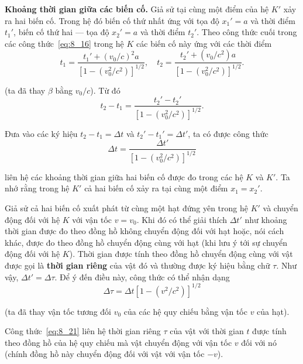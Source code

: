 \textbf{Khoảng thời gian giữa các biến cố.} Giả sử tại cùng một điểm của hệ $K'$ xảy ra hai biến cố. Trong hệ đó biến cố thứ nhất ứng với tọa độ $x_1'=a$ và thời điểm $t_1'$, biến cố thứ hai --- tọa độ $x_2'=a$ và thời điểm $t_2'$. Theo công thức cuối trong các công thức~\eqref{eq:8_16} trong hệ $K$ các biến cố này ứng với các thời điểm
\begin{equation*}
	t_1 = \frac{t_1' + (v_0/c)^2 a}{\left[1 - \left(v_0^2/c^2\right)\right]^{1/2}},\quad t_2 = \frac{t_2' + (v_0/c^2) a}{\left[1 - \left(v_0^2/c^2\right)\right]^{1/2}}.
\end{equation*}

\noindent
(ta đã thay $\beta$ bằng $v_0/c$). Từ đó
\begin{equation*}
	t_2 - t_1 = \frac{t_2' - t_2'}{\left[1 - \left(v_0^2/c^2\right)\right]^{1/2}}.
\end{equation*}

Đưa vào các ký hiệu $t_2-t_1=\Delta t$ và $t_2'-t_1'=\Delta t'$, ta có được công thức
\begin{equation}\label{eq:8_20}
	\Delta t = \frac{\Delta t'}{\left[1 - \left(v_0^2/c^2\right)\right]^{1/2}}
\end{equation}

\noindent
liên hệ các khoảng thời gian giữa hai biến cố được đo trong các hệ $K$ và $K'$. Ta nhớ rằng trong hệ $K'$ cả hai biến cố xảy ra tại cùng một điểm $x_1=x_2'$.

Giả sử cả hai biến cố xuất phát từ cùng một hạt đứng yên trong hệ $K'$ và chuyển động đối với hệ $K$ với vận tốc $v=v_0$. Khi đó có thể giải thích $\Delta t'$ như khoảng thời gian được đo theo đồng hồ không chuyển động đối với hạt hoặc, nói cách khác, được đo theo đồng hồ chuyển động cùng với hạt (khi lưu ý tới sự chuyển động đối với hệ $K$). Thời gian được tính theo đồng hồ chuyển động cùng với vật được gọi là \textbf{thời gian riêng} của vật đó và thường được ký hiệu bằng chữ $\tau$. Như vậy, $\Delta t'=\Delta\tau$. Để ý đến điều này, công thức  có thể nhận dạng
\begin{equation}\label{eq:8_21}
	\Delta\tau = \Delta t \left[1 - \left(v^2/c^2\right) \right]^{1/2}
\end{equation}

\noindent
(ta đã thay vận tốc tương đối $v_0$ của các hệ quy chiếu bằng vận tốc $v$ của hạt).

Công thức~\eqref{eq:8_21} liên hệ thời gian riêng $\tau$ của vật với thời gian $t$ được tính theo đồng hồ của hệ quy chiếu mà vật chuyển động với vận tốc $v$ đối với nó (chính đồng hồ này chuyển động đối với vật với vận tốc $-v$).

